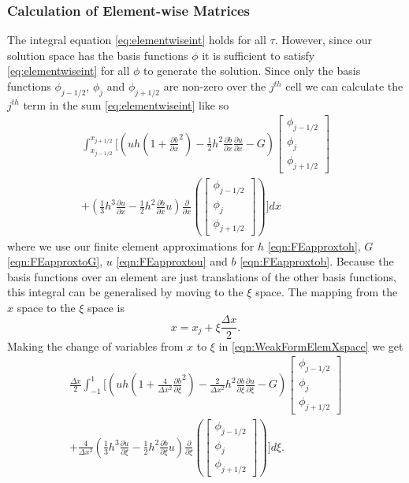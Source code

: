 \subsubsection{Calculation of Element-wise Matrices}
The integral equation \eqref{eq:elementwiseint} holds for all $\tau$. However, since our solution space has the basis functions $\phi$ it is sufficient to satisfy \eqref{eq:elementwiseint} for all $\phi$ to generate the solution. Since only the basis functions $\phi_{j-1/2}$, $\phi_{j}$ and $\phi_{j+1/2}$ are non-zero over the $j^{th}$ cell we can calculate the $j^{th}$ term in the sum \eqref{eq:elementwiseint} like so
\begin{multline}
\int_{x_{j-1/2} }^{{x_{j+1/2}}} \Bigg[  \left( uh \left(1 + \frac{\partial b}{\partial x}^2 \right)  - \frac{1}{2}h^2\frac{\partial b}{\partial x}  \frac{\partial u }{\partial x}  -  G \right) \begin{bmatrix}
\phi_{j-1/2}\\\phi_j \\\phi_{j+1/2}
\end{bmatrix}   \\ +  \left( \frac{1}{3}h^3  \frac{\partial {u}}{\partial x}    -     \frac{1}{2}h^2\frac{\partial b}{\partial x} u    \right) \frac{\partial}{\partial x}\left(\begin{bmatrix}
\phi_{j-1/2}\\\phi_j \\\phi_{j+1/2}
\end{bmatrix} \right) \Bigg]dx
\label{eqn:WeakFormElemXspace}
\end{multline}
where we use our finite element approximations for $h$ \eqref{eqn:FEapproxtoh}, $G$ \eqref{eqn:FEapproxtoG}, $u$ \eqref{eqn:FEapproxtou} and $b$ \eqref{eqn:FEapproxtob}. Because the basis functions over an element are just translations of the other basis functions, this integral can be generalised by moving to the $\xi$ space. The mapping from the $x$ space to the $\xi$ space is
\begin{equation*}
x = x_j + \xi \frac{\Delta x}{2}.
\end{equation*}
Making the change of variables from $x$ to $\xi$ in \eqref{eqn:WeakFormElemXspace} we get
\begin{multline*}
\frac{\Delta x}{2}\int_{-1 }^{1} \Bigg[  \left( uh \left(1 + \frac{4}{\Delta x^2}\frac{\partial b}{\partial \xi}^2 \right)  - \frac{2}{\Delta x^2} h^2 \frac{\partial b}{\partial \xi}  \frac{\partial u }{\partial \xi}  -  G \right) \begin{bmatrix}
\phi_{j-1/2}\\\phi_j \\\phi_{j+1/2}
\end{bmatrix}   \\ + \frac{4}{\Delta x^2} \left( \frac{1}{3}h^3 \frac{\partial {u}}{\partial \xi}    -     \frac{1}{2}h^2 \frac{\partial b}{\partial \xi} u    \right) \frac{\partial}{\partial \xi}\left(\begin{bmatrix}
\phi_{j-1/2}\\\phi_j \\\phi_{j+1/2}
\end{bmatrix} \right) \Bigg]d\xi.
\end{multline*}

